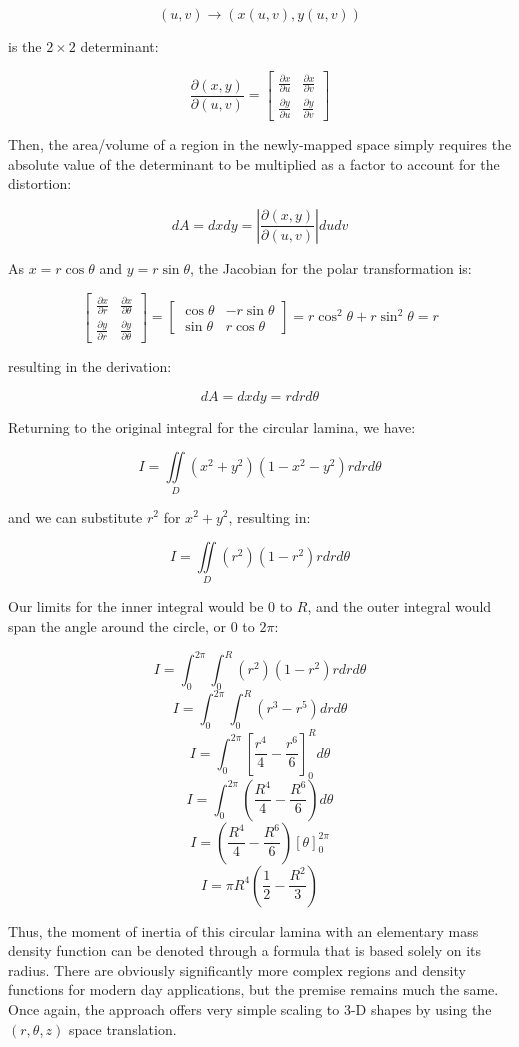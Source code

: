 \[(u, v) \rightarrow (x(u, v), y(u, v))\]

is the $2 \times 2$ determinant:

\[\frac{\partial(x,y)}{\partial(u,v)} = \begin{bmatrix} \frac{\partial x}{\partial u} & \frac{\partial x}{\partial v} \\ \frac{\partial y}{\partial u} & \frac{\partial y}{\partial v} \end{bmatrix}\]

Then, the area/volume of a region in the newly-mapped space simply requires the absolute value of the determinant to be multiplied as a factor to account for the distortion:

\[dA = dxdy = \left|\frac{\partial(x,y)}{\partial(u,v)}\right|dudv\]

As $x = r\cos \theta$ and $y = r\sin \theta$, the Jacobian for the polar transformation is:

\[ \begin{bmatrix} \frac{\partial x}{\partial r} & \frac{\partial x}{\partial \theta} \\ \frac{\partial y}{\partial r} & \frac{\partial y}{\partial \theta} \end{bmatrix} = \begin{bmatrix} \cos \theta & -r \sin \theta \\ \sin \theta & r \cos \theta \end{bmatrix} = r \cos^2{\theta} + r \sin^2{\theta} = r\]

resulting in the derivation:

\[dA = dxdy = rdrd\theta\]

Returning to the original integral for the circular lamina, we have:

\[I = \iint\limits_{D} (x^2+y^2)(1 - x^2 - y^2) rdrd\theta\]

and we can substitute $r^2$ for $x^2+y^2$, resulting in:

\[I = \iint\limits_{D} (r^2)(1 - r^2) rdrd\theta\]

Our limits for the inner integral would be $0$ to $R$, and the outer integral would span the angle around the circle, or $0$ to $2\pi$:

\[I = \int_0^{2\pi} \int_0^R (r^2)(1 - r^2) rdrd\theta\]
\[I = \int_0^{2\pi} \int_0^R (r^3 - r^5) drd\theta\]
\[I = \int_0^{2\pi} \left[\frac{r^4}{4} - \frac{r^6}{6}\right]_0^R d\theta\]
\[I = \int_0^{2\pi} \left(\frac{R^4}{4} - \frac{R^6}{6}\right) d\theta\]
\[I = \left(\frac{R^4}{4} - \frac{R^6}{6}\right)\left[\theta \right]_0^{2\pi}\]
\[I = \pi R^4\left(\frac{1}{2} - \frac{R^2}{3}\right)\]

Thus, the moment of inertia of this circular lamina with an elementary mass density function can be denoted through a formula that is based solely on its radius. There are obviously significantly more complex regions and density functions for modern day applications, but the premise remains much the same. Once again, the approach offers very simple scaling to 3-D shapes by using the $(r, \theta, z)$ space translation.